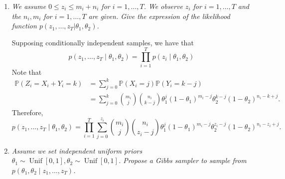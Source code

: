 \documentclass[a4paper,12pt]{article}
\newcommand{\unif}{\operatorname{Unif}}
\newcommand{\pr}{\mathbb{P}}
\theoremstyle{definition}
\begin{document}
\begin{enumerate}
    \item {\it We assume $0 \le z_i \le m_i + n_i$ for $i = 1, \dots , T$. We
    observe $z_i$ for $i = 1,\dots, T$ and the $n_i , m_i$ for
    $i = 1, \dots, T$ are given. Give the expression of the likelihood
    function $p(z_1, \dots, z_T| \theta_1, \theta_2)$.}
    
    Supposing conditionally independent samples, we have that 
    $$
    p(z_1, \dots, z_T \mid \theta_1, \theta_2) = \prod_{i=1}^T p(z_i\mid \theta_1, \theta_2)
    $$
    Note that 
    \begin{equation*}
        \begin{split}
            \pr(Z_i = X_i + Y_i = k) &= \sum_{j=0}^k \pr(X_i = j)\pr(Y_i = k-j) \\
            &= \sum_{j=0}^k \binom{m_i}{j}\binom{n_i}{k-j}\theta_1^j(1-\theta_1)^{m_i - j}\theta_2^{k-j}(1 - \theta_2)^{n_i - k + j}. 
        \end{split}
    \end{equation*}
    Therefore, 
    $$
    p(z_1, \dots, z_T \mid \theta_1, \theta_2) = \prod_{i=1}^T \sum_{j=0}^{z_i} \binom{m_i}{j}\binom{n_i}{z_i-j}\theta_1^j(1-\theta_1)^{m_i - j}\theta_2^{z_i-j}(1 - \theta_2)^{n_i - z_i + j}.
    $$

    \item {\it Assume we set independent uniform priors $\theta_1 \sim
    \unif[0,1], \theta_2 \sim \unif[0,1]$. Propose a Gibbs sampler to sample from $p( \theta_1 , \theta_2 \mid z_1 , \dots, z_T)$.}
    

\end{enumerate}
\end{document}
